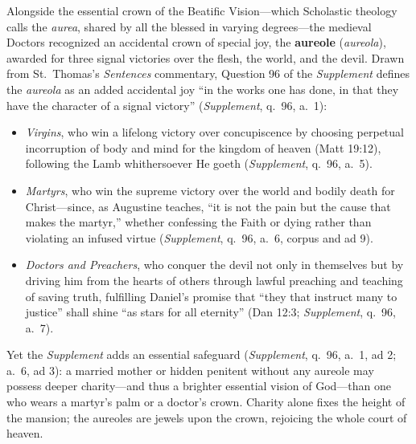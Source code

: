 Alongside the essential crown of the Beatific Vision---which Scholastic theology calls the \textit{aurea}, shared by all the blessed in varying degrees---the medieval Doctors recognized an accidental crown of special joy, the \textbf{aureole} (\textit{aureola}), awarded for three signal victories over the flesh, the world, and the devil. Drawn from St.\ Thomas's \textit{Sentences} commentary, Question 96 of the \textit{Supplement} defines the \textit{aureola} as an added accidental joy ``in the works one has done, in that they have the character of a signal victory'' (\textit{Supplement}, q.\ 96, a.\ 1):

\begin{itemize}
\item \textit{Virgins}, who win a lifelong victory over concupiscence by choosing perpetual incorruption of body and mind for the kingdom of heaven (Matt 19:12), following the Lamb whithersoever He goeth (\textit{Supplement}, q.\ 96, a.\ 5).
\item \textit{Martyrs}, who win the supreme victory over the world and bodily death for Christ---since, as Augustine teaches, ``it is not the pain but the cause that makes the martyr,'' whether confessing the Faith or dying rather than violating an infused virtue (\textit{Supplement}, q.\ 96, a.\ 6, corpus and ad 9).
\item \textit{Doctors and Preachers}, who conquer the devil not only in themselves but by driving him from the hearts of others through lawful preaching and teaching of saving truth, fulfilling Daniel's promise that ``they that instruct many to justice'' shall shine ``as stars for all eternity'' (Dan 12:3; \textit{Supplement}, q.\ 96, a.\ 7).
\end{itemize}

Yet the \textit{Supplement} adds an essential safeguard (\textit{Supplement}, q.\ 96, a.\ 1, ad 2; a.\ 6, ad 3): a married mother or hidden penitent without any aureole may possess deeper charity---and thus a brighter essential vision of God---than one who wears a martyr's palm or a doctor's crown. Charity alone fixes the height of the mansion; the aureoles are jewels upon the crown, rejoicing the whole court of heaven.
